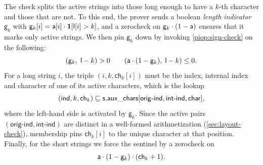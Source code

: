  The check splits the active strings into those long enough to have a $k$-th character and those that are not. To this end, the prover sends a boolean \emph{length indicator} $\mathsf{g}_k$ with $\mathsf{g}_k[i] = \mathsf{a}[i] \cdot \mathbf{1}[\mathsf{l}[i] > k]$, and a zerocheck on $\mathsf{g}_k \cdot (1 - \mathsf{a})$ ensures that it marks only active strings. We then pin $\mathsf{g}_k$ down by invoking \cref{piop:sign-check} on the following:
\begin{equation}
  \label{eq:proj-len}
  (\mathsf{g}_k,\; \mathsf{l} - k) > 0 \qquad (\mathsf{a} \cdot (1 - \mathsf{g}_k),\; \mathsf{l} - k) \leq 0.
\end{equation}
For a long string $i$, the triple $(i, k, \mathsf{ch}_k[i])$ must be the index, internal index and character of one of its active characters, which is the lookup
\begin{equation}
  \label{eq:proj-lkup}
  (\mathsf{ind}, k, \mathsf{ch}_k) \sqsubseteq \mathsf{s}.\mathsf{aux\_chars}[\mathsf{orig\text{-}ind}, \mathsf{int\text{-}ind}, \mathsf{char}],
\end{equation}
where the left-hand side is activated by $\mathsf{g}_k$. Since the active pairs $(\mathsf{orig\text{-}ind}, \mathsf{int\text{-}ind})$ are distinct in a well-formed arithmetization (\cref{sec:layout-check}), membership pins $\mathsf{ch}_k[i]$ to the unique character at that position. Finally, for the short strings we force the sentinel by a zerocheck on
\begin{equation}
  \label{eq:proj-sentinel}
  \mathsf{a} \cdot (1 - \mathsf{g}_k) \cdot (\mathsf{ch}_k + 1).
\end{equation}

